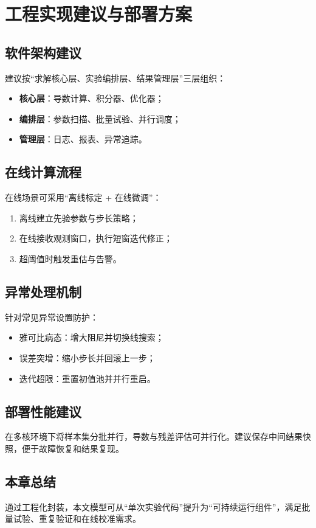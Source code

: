 \chapter{工程实现建议与部署方案}

\section{软件架构建议}
建议按“求解核心层、实验编排层、结果管理层”三层组织：
\begin{itemize}
  \item \textbf{核心层}：导数计算、积分器、优化器；
  \item \textbf{编排层}：参数扫描、批量试验、并行调度；
  \item \textbf{管理层}：日志、报表、异常追踪。
\end{itemize}

\section{在线计算流程}
在线场景可采用“离线标定 + 在线微调”：
\begin{enumerate}
  \item 离线建立先验参数与步长策略；
  \item 在线接收观测窗口，执行短窗迭代修正；
  \item 超阈值时触发重估与告警。
\end{enumerate}

\section{异常处理机制}
针对常见异常设置防护：
\begin{itemize}
  \item 雅可比病态：增大阻尼并切换线搜索；
  \item 误差突增：缩小步长并回滚上一步；
  \item 迭代超限：重置初值池并并行重启。
\end{itemize}

\section{部署性能建议}
在多核环境下将样本集分批并行，导数与残差评估可并行化。建议保存中间结果快照，便于故障恢复和结果复现。

\section{本章总结}
通过工程化封装，本文模型可从“单次实验代码”提升为“可持续运行组件”，满足批量试验、重复验证和在线校准需求。
